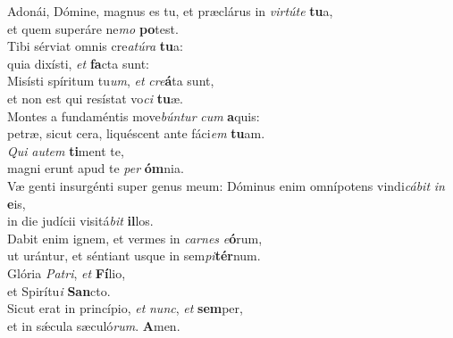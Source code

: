 \evenverse Adonái, Dómine, magnus es tu, et præclárus in \textit{vir}\textit{tú}\textit{te} \textbf{tu}a,~\*\\
\evenverse et quem superáre ne\textit{mo} \textbf{po}test.\\
\oddverse Tibi sérviat omnis cre\textit{a}\textit{tú}\textit{ra} \textbf{tu}a:~\*\\
\oddverse quia dixísti, \textit{et} \textbf{fa}cta sunt:\\
\evenverse Misísti spíritum tu\textit{um}, \textit{et} \textit{cre}\textbf{á}ta sunt,~\*\\
\evenverse et non est qui resístat vo\textit{ci} \textbf{tu}æ.\\
\oddverse Montes a fundaméntis move\textit{bún}\textit{tur} \textit{cum} \textbf{a}quis:~\*\\
\oddverse petræ, sicut cera, liquéscent ante fáci\textit{em} \textbf{tu}am.\\
\evenverse \textit{Qui} \textit{au}\textit{tem} \textbf{ti}ment te,~\*\\
\evenverse magni erunt apud te \textit{per} \textbf{óm}nia.\\
\oddverse Væ genti insurgénti super genus meum: Dóminus enim omnípotens vindi\textit{cá}\textit{bit} \textit{in} \textbf{e}is,~\*\\
\oddverse in die judícii visitá\textit{bit} \textbf{il}los.\\
\evenverse Dabit enim ignem, et vermes in \textit{car}\textit{nes} \textit{e}\textbf{ó}rum,~\*\\
\evenverse ut urántur, et séntiant usque in sem\textit{pi}\textbf{tér}num.\\
\oddverse Glória \textit{Pa}\textit{tri}, \textit{et} \textbf{Fí}lio,~\*\\
\oddverse et Spirítu\textit{i} \textbf{San}cto.\\
\evenverse Sicut erat in princípio, \textit{et} \textit{nunc}, \textit{et} \textbf{sem}per,~\*\\
\evenverse et in sǽcula sæculó\textit{rum}. \textbf{A}men.\\
